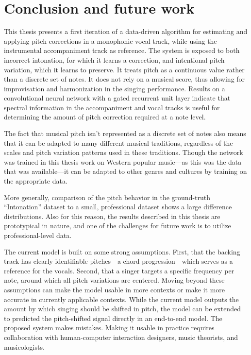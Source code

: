 \chapter{Conclusion and future work}
\label{chap:conclusion}

This thesis presents a first iteration of a data-driven algorithm for estimating and applying pitch corrections in a monophonic vocal track, while using the instrumental accompaniment track as reference. The system is exposed to both incorrect intonation, for which it learns a correction, and intentional pitch variation, which it learns to preserve. It treats pitch as a continuous value rather than a discrete set of notes. It does not rely on a musical score, thus allowing for improvisation and harmonization in the singing performance. Results on a convolutional neural network with a gated recurrent unit layer indicate that spectral information in the accompaniment and vocal tracks is useful for determining the amount of pitch correction required at a note level. 

The fact that musical pitch isn't represented as a discrete set of notes also means that it can be adapted to many different musical traditions, regardless of the scales and pitch variation patterns used in these traditions. Though the network was trained in this thesis work on Western popular music---as this was the data that was available---it can be adapted to other genres and cultures by training on the appropriate data.

More generally, comparison of the pitch behavior in the ground-truth ``Intonation'' dataset to a small, professional dataset shows a large difference distributions. Also for this reason, the results described in this thesis are prototypical in nature, and one of the challenges for future work is to utilize professional-level data. 

The current model is built on some strong assumptions. First, that the backing track has clearly identifiable pitches---a chord progression---which serves as a reference for the vocals. Second, that a singer targets a specific frequency per note, around which all pitch variations are centered. Moving beyond these assumptions can make the model usable in more contexts or make it more accurate in currently applicable contexts. While the current model outputs the amount by which singing should be shifted in pitch, the model can be extended to predicted the pitch-shifted signal directly in an end-to-end model. The proposed system makes mistakes. Making it usable in practice requires collaboration with human-computer interaction designers, music theorists, and musicologists.
